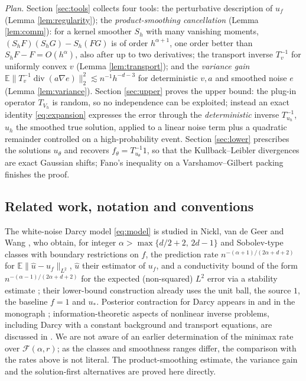 \documentclass[11pt]{article}
\numberwithin{equation}{section}
\newcommand{\E}{\mathbb E}
\newcommand{\diver}{\operatorname{div}}
\begin{document}
\emph{Plan.} Section \ref{sec:tools} collects four tools: the
perturbative description of $u_f$ (Lemma \ref{lem:regularity}); the
\emph{product-smoothing cancellation} (Lemma \ref{lem:comm}): for a
kernel smoother $S_h$ with many vanishing moments,
$(S_hF)(S_hG)-S_h(FG)$ is of order $h^{\alpha+1}$, one order better
than $S_hF-F=O(h^\alpha)$, also after up to two derivatives; the
transport inverse $T_v^{-1}$ for uniformly convex $v$ (Lemma
\ref{lem:transport}); and the \emph{variance gain}
$\E\|T_v^{-1}\diver(a\nabla e)\|_2^2\lesssim n^{-1}h^{-d-3}$ for
deterministic $v,a$ and smoothed noise $e$ (Lemma \ref{lem:variance}).
Section \ref{sec:upper} proves the upper bound: the plug-in operator
$T_{V_h}$ is random, so no independence can be exploited; instead an
exact identity \eqref{eq:expansion} expresses the error through the
\emph{deterministic} inverse $T_{u_h}^{-1}$, $u_h$ the smoothed true
solution, applied to a linear noise term plus a quadratic remainder
controlled on a high-probability event. Section \ref{sec:lower}
prescribes the solutions $u_\theta$ and recovers
$f_\theta=T_{u_\theta}^{-1}1$, so that the Kullback--Leibler
divergences are exact Gaussian shifts; Fano's inequality on a
Varshamov--Gilbert packing finishes the proof.

\subsection{Related work, notation and conventions}\label{sec:notation}

The white-noise Darcy model \eqref{eq:model} is studied in Nickl, van
de Geer and Wang \cite{NvdGW}, who obtain, for integer
$\alpha>\max\{d/2+2,\,2d-1\}$ and Sobolev-type classes with boundary
restrictions on $f$, the prediction rate
$n^{-(\alpha+1)/(2\alpha+d+2)}$ for $\E\|\widehat u-u_f\|_{L^2}$,
$\widehat u$ their estimator of $u_f$, and a conductivity bound of the form $n^{-(\alpha-1)/(2\alpha+d+2)}$ for the
expected (non-squared) $L^2$ error via a stability estimate
\cite[Theorems 9--11]{NvdGW}; their lower-bound construction already
uses the unit ball, the source $1$, the baseline $f=1$ and $u_*$.
Posterior contraction for Darcy appears in \cite{GiNi} and in the
monograph \cite{Nickl23}; information-theoretic aspects of nonlinear
inverse problems, including Darcy with a constant background and
transport equations, are discussed in \cite{NP}. We are not aware of
an earlier determination of the minimax rate over
$\mathcal F(\alpha,r)$; as the classes and smoothness ranges differ,
the comparison with the rates above is not literal.
The product-smoothing estimate, the variance gain and the
solution-first alternatives are proved here directly.
\end{document}
